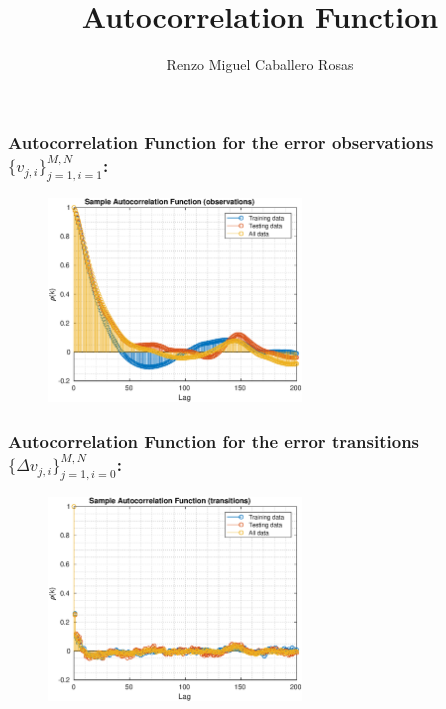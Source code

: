 \documentclass[aspectratio=169]{beamer}\usepackage[utf8]{inputenc}
\title{Autocorrelation Function}
\subtitle{Renzo Miguel Caballero Rosas}
\begin{document}
\begin{frame}
\titlepage
\end{frame}

\begin{frame}\frametitle{Autocorrelation Function for the error observations $\{v_{j,i}\}_{j=1,i=1}^{M,N}$:}

\begin{figure}[ht!]
\centering
\includegraphics[width=0.6\textwidth]{observations.eps}
\end{figure}

\end{frame}

\begin{frame}\frametitle{Autocorrelation Function for the error transitions $\{\Delta v_{j,i}\}_{j=1,i=0}^{M,N}$:}

\begin{figure}[ht!]
\centering
\includegraphics[width=0.6\textwidth]{transitions.eps}
\end{figure}

\end{frame}
\end{document}
